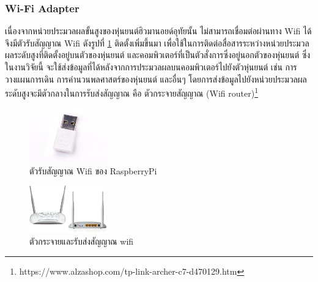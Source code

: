 \subsubsection*{Wi-Fi Adapter}
เนื่องจากหน่วยประมวลผลขั้นสูงของหุ่นยนต์ฮิวมานอยด์อุทัยนั้น ไม่สามารถเชื่อมต่อผ่านทาง Wifi ได้
จึงมีตัวรับสัญญาณ Wifi ดังรูปที่ \ref{fig:rpi_wifi_adaptor} ติดตั้งเพิ่มขึ้นมา เพื่อใช้ในการติดต่อสื่อสารระหว่างหน่วยประมวลผลระดับสูงที่ติดตั้งอยู่บนตัวของหุ่นยนต์
และคอมพิวเตอร์ที่เป็นตัวสั่งการซึ่งอยู่นอกตัวของหุ่นยนต์ ซึ่งในงานวิจัยนี้
จะใช้ส่งข้อมูลที่ได้หลังจากการประมวลผลบนคอมพิวเตอร์ไปยังตัวหุ่นยนต์ เช่น การวางแผนการเดิน การคำนวนพลศาสตร์ของหุ่นยนต์
และอื่นๆ โดยการส่งข้อมูลไปยังหน่วยประมวลผลระดับสูงจะมีตัวกลางในการรับส่งสัญญาณ
คือ ตัวกระจายสัญญาณ (Wifi router)\footnote{https://www.alzashop.com/tp-link-archer-c7-d470129.htm}
\begin{figure}[!ht]
    \centering
    \includegraphics[width=0.3\textwidth]{chapter3/images/rpi_wifi_adaptor.jpg}
    \caption{ตัวรับสัญญาณ Wifi ของ RaspberryPi}
    \label{fig:rpi_wifi_adaptor}
\end{figure}
\begin{figure}[!ht]
    \centering
    \includegraphics[width=0.3\textwidth]{chapter3/images/wifi_router.jpg}
    \caption{ตัวกระจายและรับส่งสัญญาณ wifi}
    \label{fig:wifi_router}
\end{figure}


\clearpage
